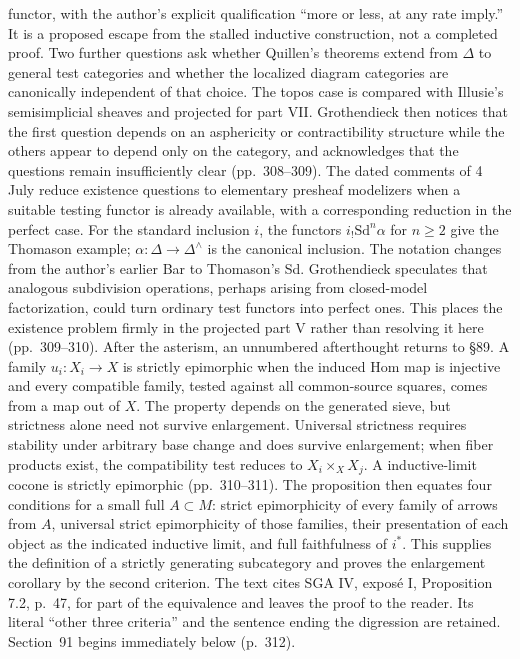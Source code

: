 \documentclass[10pt,oneside]{book}
\begin{document}
functor, with the author's explicit qualification “more or less, at any rate imply.” It is a proposed escape from the stalled inductive construction, not a completed proof. Two further questions ask whether Quillen's theorems extend from $\Delta$ to general test categories and whether the localized diagram categories are canonically independent of that choice. The topos case is compared with Illusie's semisimplicial sheaves and projected for part VII. Grothendieck then notices that the first question depends on an asphericity or contractibility structure while the others appear to depend only on the category, and acknowledges that the questions remain insufficiently clear (pp.\ 308--309). The dated comments of 4 July reduce existence questions to elementary presheaf modelizers when a suitable testing functor is already available, with a corresponding reduction in the perfect case. For the standard inclusion $i$, the functors $i_!\mathrm{Sd}^n\alpha$ for $n\geq2$ give the Thomason example; $\alpha:\Delta\to\Delta^\wedge$ is the canonical inclusion. The notation changes from the author's earlier Bar to Thomason's Sd. Grothendieck speculates that analogous subdivision operations, perhaps arising from closed-model factorization, could turn ordinary test functors into perfect ones. This places the existence problem firmly in the projected part V rather than resolving it here (pp.\ 309--310). After the asterism, an unnumbered afterthought returns to \S89. A family $u_i:X_i\to X$ is strictly epimorphic when the induced Hom map is injective and every compatible family, tested against all common-source squares, comes from a map out of $X$. The property depends on the generated sieve, but strictness alone need not survive enlargement. Universal strictness requires stability under arbitrary base change and does survive enlargement; when fiber products exist, the compatibility test reduces to $X_i\times_X X_j$. A inductive-limit cocone is strictly epimorphic (pp.\ 310--311). The proposition then equates four conditions for a small full $A\subset M$: strict epimorphicity of every family of arrows from $A$, universal strict epimorphicity of those families, their presentation of each object as the indicated inductive limit, and full faithfulness of $i^*$. This supplies the definition of a strictly generating subcategory and proves the enlargement corollary by the second criterion. The text cites SGA IV, expos\'e I, Proposition 7.2, p.\ 47, for part of the equivalence and leaves the proof to the reader. Its literal “other three criteria” and the sentence ending the digression are retained. Section~91 begins immediately below (p.\ 312).
\end{document}
